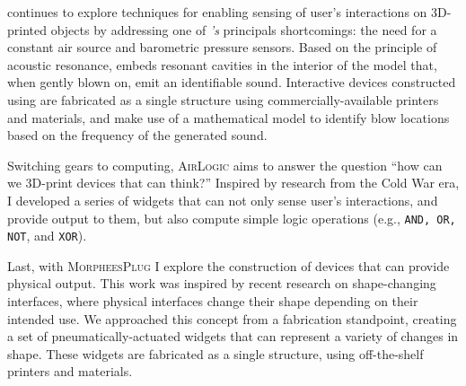         \textsc{\bh} continues to explore techniques for enabling sensing of
        user's interactions on 3D-printed objects by addressing one of
        \emph{\at's} principals shortcomings: the need for a constant air source
        and barometric pressure sensors. Based on the principle of acoustic
        resonance, \emph{\bh} embeds resonant cavities in the interior of the
        model that, when gently blown on, emit an identifiable sound.
        Interactive devices constructed using \emph{\bh} are fabricated as a
        single structure using commercially-available printers and materials,
        and make use of a mathematical model to identify blow locations based on
        the frequency of the generated sound.

        Switching gears to computing, \textsc{AirLogic} aims to answer the
        question ``how can we 3D-print devices that can think?'' Inspired by
        research from the Cold War era, I developed a series of widgets that can not
        only sense user's interactions, and provide output to them, but also
        compute simple logic operations (e.g., \texttt{AND, OR, NOT}, and
        \texttt{XOR}).

        Last, with \textsc{MorpheesPlug} I explore the construction of devices
        that can provide physical output. This work was inspired by recent
        research on shape-changing interfaces, where physical interfaces change
        their shape depending on their intended use. We approached this concept
        from a fabrication standpoint, creating a set of pneumatically-actuated
        widgets that can represent a variety of changes in shape. These widgets
        are fabricated as a single structure, using off-the-shelf printers and
        materials.